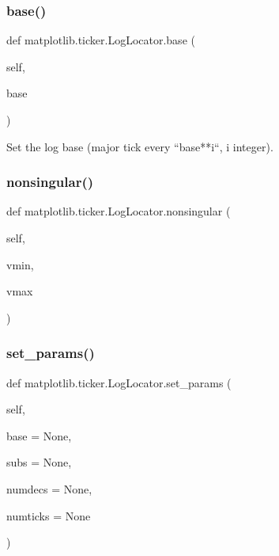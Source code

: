 \subsubsection{\texorpdfstring{base()}{base()}}
{\footnotesize\ttfamily def matplotlib.\+ticker.\+Log\+Locator.\+base (\begin{DoxyParamCaption}\item[{}]{self,  }\item[{}]{base }\end{DoxyParamCaption})}

\begin{DoxyVerb}Set the log base (major tick every ``base**i``, i integer).\end{DoxyVerb}
 \mbox{\label{classmatplotlib_1_1ticker_1_1LogLocator_ae8dc88adcdc530e6cb4d8af788edb2ff}} 
\subsubsection{\texorpdfstring{nonsingular()}{nonsingular()}}
{\footnotesize\ttfamily def matplotlib.\+ticker.\+Log\+Locator.\+nonsingular (\begin{DoxyParamCaption}\item[{}]{self,  }\item[{}]{vmin,  }\item[{}]{vmax }\end{DoxyParamCaption})}

\mbox{\label{classmatplotlib_1_1ticker_1_1LogLocator_a4747347c5cc05a9b664aeebfb8af3d35}} 
\subsubsection{\texorpdfstring{set\+\_\+params()}{set\_params()}}
{\footnotesize\ttfamily def matplotlib.\+ticker.\+Log\+Locator.\+set\+\_\+params (\begin{DoxyParamCaption}\item[{}]{self,  }\item[{}]{base = {\ttfamily None},  }\item[{}]{subs = {\ttfamily None},  }\item[{}]{numdecs = {\ttfamily None},  }\item[{}]{numticks = {\ttfamily None} }\end{DoxyParamCaption})}

